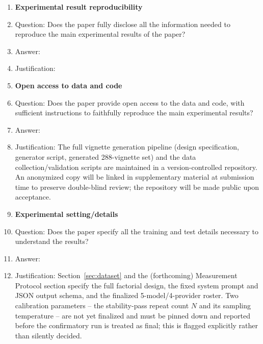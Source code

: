\begin{enumerate}
\item {\bf Experimental result reproducibility}
    \item[] Question: Does the paper fully disclose all the information needed to reproduce the main experimental results of the paper?
    \item[] Answer: \answerTODO{}
    \item[] Justification: \justificationTODO{} %

\item {\bf Open access to data and code}
    \item[] Question: Does the paper provide open access to the data and code, with sufficient instructions to faithfully reproduce the main experimental results?
    \item[] Answer: \answerYes{}
    \item[] Justification: The full vignette generation pipeline (design specification, generator script, generated 288-vignette set) and the data collection/validation scripts are maintained in a version-controlled repository. An anonymized copy will be linked in supplementary material at submission time to preserve double-blind review; the repository will be made public upon acceptance.

\item {\bf Experimental setting/details}
    \item[] Question: Does the paper specify all the training and test details necessary to understand the results?
    \item[] Answer: \answerYes{}
    \item[] Justification: Section~\ref{sec:dataset} and the (forthcoming) Measurement Protocol section specify the full factorial design, the fixed system prompt and JSON output schema, and the finalized 5-model/4-provider roster. Two calibration parameters -- the stability-pass repeat count $N$ and its sampling temperature -- are not yet finalized and must be pinned down and reported before the confirmatory run is treated as final; this is flagged explicitly rather than silently decided.


\end{enumerate}
